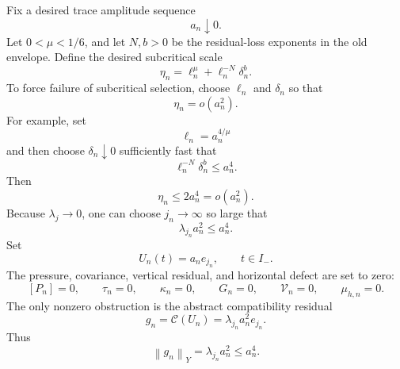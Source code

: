 \documentclass[11pt]{article}
\numberwithin{equation}{section}
\newcommand{\norm}[2]{\left\|#1\right\|_{#2}}
\newcommand{\calC}{\mathcal C}
\newcommand{\calV}{\mathcal V}
\begin{document}
Fix a desired trace amplitude sequence
\[
a_n\downarrow0.
\]
Let \(0<\mu<1/6\), and let \(N,b>0\) be the residual-loss exponents in the old envelope.  Define the desired subcritical scale
\begin{equation}\label{eq:eta-n-def}
\eta_n=\ell_n^\mu+\ell_n^{-N}\delta_n^b.
\end{equation}
To force failure of subcritical selection, choose \(\ell_n\) and \(\delta_n\) so that
\begin{equation}\label{eq:eta-small-an}
\eta_n=o(a_n^2).
\end{equation}
For example, set
\[
\ell_n=a_n^{4/\mu}
\]
and then choose \(\delta_n\downarrow0\) sufficiently fast that
\[
\ell_n^{-N}\delta_n^b\le a_n^4.
\]
Then
\[
\eta_n\le 2a_n^4=o(a_n^2).
\]
Because \(\lambda_j\to0\), one can choose \(j_n\to\infty\) so large that
\begin{equation}\label{eq:jn-choice-expanded}
\lambda_{j_n}a_n^2\le a_n^4.
\end{equation}
Set
\begin{equation}\label{eq:Un-high-mode}
U_n(t)=a_ne_{j_n},
\qquad t\in I_-.
\end{equation}
The pressure, covariance, vertical residual, and horizontal defect are set to zero:
\begin{equation}\label{eq:zero-defects-model}
[P_n]=0,
\qquad
\tau_n=0,
\qquad
\kappa_n=0,
\qquad
G_n=0,
\qquad
\calV_n=0,
\qquad
\mu_{h,n}=0.
\end{equation}
The only nonzero obstruction is the abstract compatibility residual
\[
g_n=\calC(U_n)=\lambda_{j_n}a_n^2e_{j_n}.
\]
Thus
\begin{equation}\label{eq:gn-small-expanded}
\norm{g_n}{Y}=\lambda_{j_n}a_n^2\le a_n^4.
\end{equation}
\end{document}
